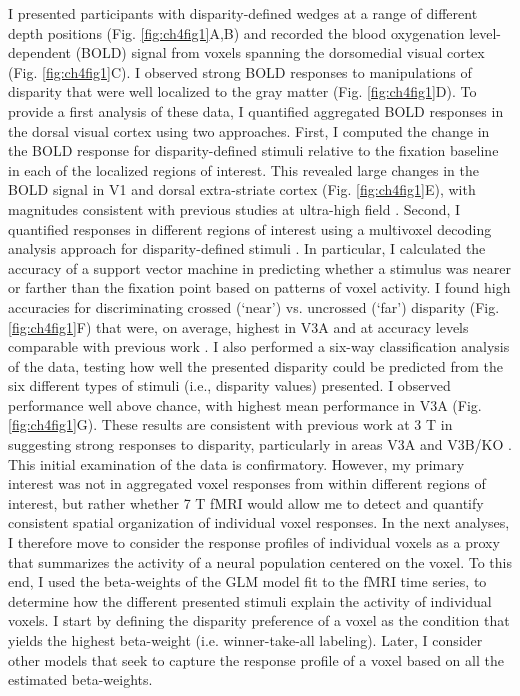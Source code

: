 I presented participants with disparity-defined wedges at a range of different depth positions (Fig. \ref{fig:ch4fig1}A,B) and recorded the blood oxygenation level-dependent (BOLD) signal from voxels spanning the dorsomedial visual cortex (Fig. \ref{fig:ch4fig1}C). I observed strong BOLD responses to manipulations of disparity that were well localized to the gray matter (Fig. \ref{fig:ch4fig1}D). To provide a first analysis of these data, I quantified aggregated BOLD responses in the dorsal visual cortex using two approaches. First, I computed the change in the BOLD response for disparity-defined stimuli relative to the fixation baseline in each of the localized regions of interest. This revealed large changes in the BOLD signal in V1 and dorsal extra-striate cortex (Fig. \ref{fig:ch4fig1}E), with magnitudes consistent with previous studies at ultra-high field \cite{Hoffmann:2009vn,Zwaag:2009ss,Polimeni:2010fl}. Second, I quantified responses in different regions of interest using a multivoxel decoding analysis approach for disparity-defined stimuli \cite{Preston:2008dg}. In particular, I calculated the accuracy of a support vector machine in predicting whether a stimulus was nearer or farther than the fixation point based on patterns of voxel activity. I found high accuracies for discriminating crossed (`near') vs. uncrossed (`far') disparity (Fig. \ref{fig:ch4fig1}F) that were, on average, highest in V3A and at accuracy levels comparable with previous work \cite{Preston:2008dg}. I also performed a six-way classification analysis of the data, testing how well the presented disparity could be predicted from the six different types of stimuli (i.e., disparity values) presented. I observed performance well above chance, with highest mean performance in V3A (Fig. \ref{fig:ch4fig1}G). These results are consistent with previous work at 3 T in suggesting strong responses to disparity, particularly in areas V3A and V3B/KO \cite{Backus:2001ly,Tsao:2003lk,Preston:2008dg}. 
This initial examination of the data is confirmatory. However, my primary interest was not in aggregated voxel responses from within different regions of interest, but rather whether 7 T fMRI would allow me to detect and quantify consistent spatial organization of individual voxel responses. In the next analyses, I therefore move to consider the response profiles of individual voxels as a proxy that summarizes the activity of a neural population centered on the voxel. To this end, I used the beta-weights of the GLM model fit to the fMRI time series, to determine how the different presented stimuli explain the activity of individual voxels. I start by defining the disparity preference of a voxel as the condition that yields the highest beta-weight (i.e. winner-take-all labeling). Later, I consider other models that seek to capture the response profile of a voxel based on all the estimated beta-weights.

